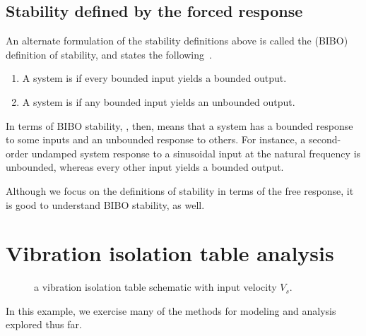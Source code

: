 \documentclass[dynamic_systems.tex]{subfiles}
\begin{document}
\subsection{Stability defined by the forced response}
\tags{}

An alternate formulation of the stability definitions above is called the  (BIBO) definition of stability, and states the following~\cite{Nise2015}.
\tags{}
\begin{enumerate}
	\item A system is  if every bounded input yields a bounded output.
	\item A system is  if any bounded input yields an unbounded output.
\end{enumerate}

In terms of BIBO stability, , then, means that a system has a bounded response to some inputs and an unbounded response to others. For instance, a second-order undamped system response to a sinusoidal input at the natural frequency is unbounded, whereas every other input yields a bounded output.

Although we focus on the definitions of stability in terms of the free response, it is good to understand BIBO stability, as well.
\tags{}

\section{Vibration isolation table analysis}
\tags{}

\begingroup
\begin{wrapfigure}[10]{r}{0.35\textwidth}
  \centering
  \caption{\label{fig:vibration_table_schematic} a vibration isolation table schematic with input velocity $V_s$.}
\end{wrapfigure}
In this example, we exercise many of the methods for modeling and analysis explored thus far.
\end{document}
